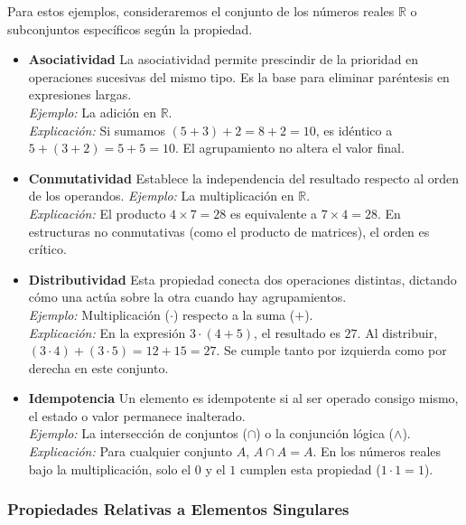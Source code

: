 \documentclass{article}
\begin{document}
Para estos ejemplos, consideraremos el conjunto de los números reales $\mathbb{R}$ o subconjuntos específicos según la propiedad.
\begin{itemize}
\item \textbf{Asociatividad} 
La asociatividad permite prescindir de la prioridad en operaciones sucesivas del mismo tipo. Es la base para eliminar paréntesis en expresiones largas.\\
\textit{Ejemplo:} La adición en $\mathbb{R}$. \\
\textit{Explicación:} Si sumamos $(5 + 3) + 2 = 8 + 2 = 10$, es idéntico a $5 + (3 + 2) = 5 + 5 = 10$. El agrupamiento no altera el valor final.
\bigskip

\item \textbf{Conmutatividad}
Establece la independencia del resultado respecto al orden de los operandos.
\textit{Ejemplo:} La multiplicación en $\mathbb{R}$. \\
\textit{Explicación:} El producto $4 \times 7 = 28$ es equivalente a $7 \times 4 = 28$. En estructuras no conmutativas (como el producto de matrices), el orden es crítico.
\bigskip

\item \textbf{Distributividad}
Esta propiedad conecta dos operaciones distintas, dictando cómo una actúa sobre la otra cuando hay agrupamientos.\\
\textit{Ejemplo:} Multiplicación ($\cdot$) respecto a la suma ($+$).\\
\textit{Explicación:} En la expresión $3 \cdot (4 + 5)$, el resultado es $27$. Al distribuir, $(3 \cdot 4) + (3 \cdot 5) = 12 + 15 = 27$. Se cumple tanto por izquierda como por derecha en este conjunto.
\bigskip

\item \textbf{Idempotencia}
Un elemento es idempotente si al ser operado consigo mismo, el estado o valor permanece inalterado.\\
\textit{Ejemplo:} La intersección de conjuntos ($\cap$) o la conjunción lógica ($\wedge$). \\
\textit{Explicación:} Para cualquier conjunto $A$, $A \cap A = A$. En los números reales bajo la multiplicación, solo el $0$ y el $1$ cumplen esta propiedad ($1 \cdot 1 = 1$).
\bigskip

\end{itemize}


\subsubsection{Propiedades Relativas a Elementos Singulares}
\end{document}
